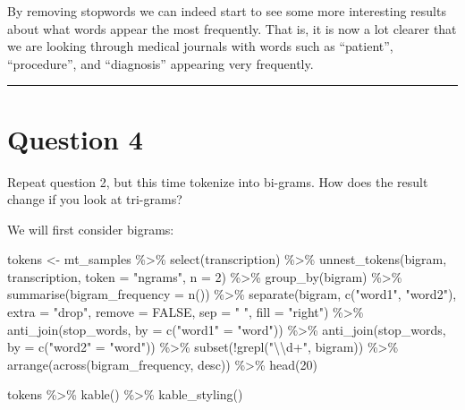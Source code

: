 \documentclass[
]{article}
\newenvironment{Shaded}{\begin{snugshade}}{\end{snugshade}}
\newcommand{\AttributeTok}[1]{\textcolor[rgb]{0.77,0.63,0.00}{#1}}
\newcommand{\ConstantTok}[1]{\textcolor[rgb]{0.00,0.00,0.00}{#1}}
\newcommand{\DecValTok}[1]{\textcolor[rgb]{0.00,0.00,0.81}{#1}}
\newcommand{\FunctionTok}[1]{\textcolor[rgb]{0.00,0.00,0.00}{#1}}
\newcommand{\NormalTok}[1]{#1}
\newcommand{\OtherTok}[1]{\textcolor[rgb]{0.56,0.35,0.01}{#1}}
\newcommand{\SpecialCharTok}[1]{\textcolor[rgb]{0.00,0.00,0.00}{#1}}
\newcommand{\StringTok}[1]{\textcolor[rgb]{0.31,0.60,0.02}{#1}}
\begin{document}
By removing stopwords we can indeed start to see some more interesting
results about what words appear the most frequently. That is, it is now
a lot clearer that we are looking through medical journals with words
such as ``patient'', ``procedure'', and ``diagnosis'' appearing very
frequently.

\begin{center}\rule{0.5\linewidth}{0.5pt}\end{center}

\hypertarget{question-4}{%
\section{Question 4}\label{question-4}}

Repeat question 2, but this time tokenize into bi-grams. How does the
result change if you look at tri-grams?

We will first consider bigrams:

\begin{Shaded}
\begin{Highlighting}[]
\NormalTok{tokens }\OtherTok{\textless{}{-}}\NormalTok{ mt\_samples }\SpecialCharTok{\%\textgreater{}\%}
  \FunctionTok{select}\NormalTok{(transcription) }\SpecialCharTok{\%\textgreater{}\%}
  \FunctionTok{unnest\_tokens}\NormalTok{(bigram, transcription, }\AttributeTok{token =} \StringTok{"ngrams"}\NormalTok{, }\AttributeTok{n =} \DecValTok{2}\NormalTok{) }\SpecialCharTok{\%\textgreater{}\%}
  \FunctionTok{group\_by}\NormalTok{(bigram) }\SpecialCharTok{\%\textgreater{}\%}
  \FunctionTok{summarise}\NormalTok{(}\AttributeTok{bigram\_frequency =} \FunctionTok{n}\NormalTok{()) }\SpecialCharTok{\%\textgreater{}\%}
  \FunctionTok{separate}\NormalTok{(bigram, }
           \FunctionTok{c}\NormalTok{(}\StringTok{"word1"}\NormalTok{, }\StringTok{"word2"}\NormalTok{), }
           \AttributeTok{extra =} \StringTok{"drop"}\NormalTok{, }
           \AttributeTok{remove =} \ConstantTok{FALSE}\NormalTok{, }
           \AttributeTok{sep =} \StringTok{" "}\NormalTok{, }
           \AttributeTok{fill =} \StringTok{"right"}\NormalTok{) }\SpecialCharTok{\%\textgreater{}\%}
  \FunctionTok{anti\_join}\NormalTok{(stop\_words, }\AttributeTok{by =} \FunctionTok{c}\NormalTok{(}\StringTok{"word1"} \OtherTok{=} \StringTok{"word"}\NormalTok{)) }\SpecialCharTok{\%\textgreater{}\%}
  \FunctionTok{anti\_join}\NormalTok{(stop\_words, }\AttributeTok{by =} \FunctionTok{c}\NormalTok{(}\StringTok{"word2"} \OtherTok{=} \StringTok{"word"}\NormalTok{)) }\SpecialCharTok{\%\textgreater{}\%}
  \FunctionTok{subset}\NormalTok{(}\SpecialCharTok{!}\FunctionTok{grepl}\NormalTok{(}\StringTok{"}\SpecialCharTok{\textbackslash{}\textbackslash{}}\StringTok{d+"}\NormalTok{, bigram)) }\SpecialCharTok{\%\textgreater{}\%}
  \FunctionTok{arrange}\NormalTok{(}\FunctionTok{across}\NormalTok{(bigram\_frequency, desc)) }\SpecialCharTok{\%\textgreater{}\%}
  \FunctionTok{head}\NormalTok{(}\DecValTok{20}\NormalTok{)}

\NormalTok{tokens }\SpecialCharTok{\%\textgreater{}\%}
  \FunctionTok{kable}\NormalTok{() }\SpecialCharTok{\%\textgreater{}\%}
  \FunctionTok{kable\_styling}\NormalTok{()}
\end{Highlighting}
\end{Shaded}
\end{document}
